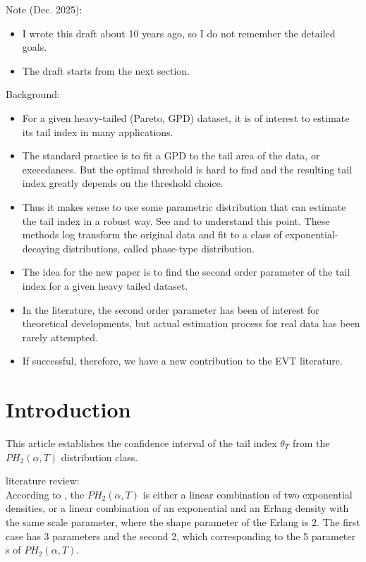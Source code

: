\documentclass[11pt]{article}
\begin{document}
Note (Dec. 2025):
\begin{itemize}
  \item I wrote this draft about 10 years ago, so I do not remember the detailed goals.
  \item The draft starts from the next section.
\end{itemize}
Background:
\begin{itemize}
  \item For a given heavy-tailed (Pareto, GPD) dataset, it is of interest to estimate its tail index in many applications.
  \item The standard practice is to fit a GPD to the tail area of the data, or exceedances. But the optimal threshold is hard to find and the resulting tail index greatly depends on the threshold choice. 
  \item Thus it makes sense to use some parametric distribution that can estimate the tail index in a robust way. See \cite{Ahn+Kim+etal:12a} and \cite{Kim+Kim:15a} to understand this point. These methods log transform the original data and fit to a class of exponential-decaying distributions, called phase-type distribution.
  \item The idea for the new paper is to find the second order parameter of the tail index for a given heavy tailed dataset.
  \item In the literature, the second order parameter has been of interest for theoretical developments, but actual estimation process for real data has been rarely attempted.
  \item If successful, therefore, we have a new contribution to the EVT literature.
\end{itemize}
\section{Introduction}
This article establishes the confidence interval of the tail index $\theta_T$ from the $PH_2(\alpha, T)$ distribution class.

literature review: \\

According to \cite{Dicks+Hipp:00a}, the $PH_2(\alpha, T)$ is either a linear combination of two exponential densities, or a linear combination of an exponential and an Erlang density with the same scale parameter, where the shape parameter of the Erlang is 2. The first case has 3 parameters and the second 2, which corresponding to the 5 parameter s of $PH_2(\alpha, T)$. \\
\end{document}
